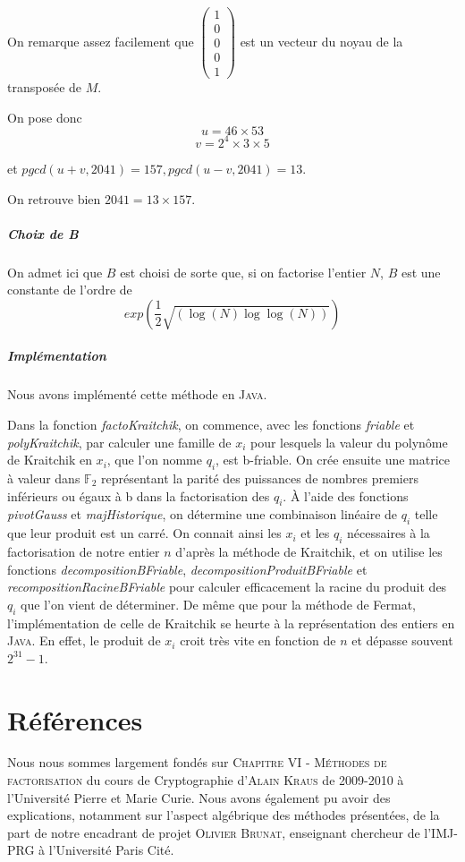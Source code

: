 \documentclass[11pt,a4paper]{article}
\begin{document}
 	On remarque assez facilement que 
 	$\begin{pmatrix}
 		1\\
 		0\\
 		0\\
 		0\\
 		1
 	\end{pmatrix}$ est un vecteur du noyau de la transposée de $M$.
 
 	On pose donc 
 	$$ u = 46 \times 53 $$ 
 	$$ v = 2^4 \times 3 \times 5$$
 	
 	et $pgcd(u+v, 2041) = 157, pgcd(u-v, 2041) = 13$.
 	
 	On retrouve bien $2041 = 13 \times 157$.
 	
 	
 	\subparagraph{Choix de B}
	
	On admet ici que $B$ est choisi de sorte que, si on factorise l'entier $N$, $B$ est une constante de l'ordre de 
	$$exp(\frac{1}{2} \sqrt{(\log(N) \log\log(N))})$$
		
	\subparagraph{Implémentation}
	Nous avons implémenté cette méthode en \textsc{Java}.

	Dans la fonction \textit{factoKraitchik}, on commence, avec les fonctions \textit{friable} et \textit{polyKraitchik}, par calculer une famille de $x_i$ pour lesquels la valeur du polynôme de Kraitchik en $x_i$, que l'on nomme $q_i$, est b-friable. On crée ensuite une matrice à valeur dans $\mathbb{F}_2$ représentant la parité des puissances de nombres premiers inférieurs ou égaux à b dans la factorisation des $q_i$. À l'aide des fonctions \textit{pivotGauss} et \textit{majHistorique}, on détermine une combinaison linéaire de $q_i$ telle que leur produit est un carré. On connait ainsi les $x_i$ et les $q_i$ nécessaires à la factorisation de notre entier $n$ d'après la méthode de Kraitchik, et on utilise les fonctions \textit{decompositionBFriable}, \textit{decompositionProduitBFriable} et \textit{recompositionRacineBFriable} pour calculer efficacement la racine du produit des $q_i$ que l'on vient de déterminer. De même que pour la méthode de Fermat, l'implémentation de celle de Kraitchik se heurte à la représentation des entiers en \textsc{Java}. En effet, le produit de $x_i$ croit très vite en fonction de $n$ et dépasse souvent $2^{31} - 1$.
	
	
	\newpage
	\section{\LARGE{Références}}
	Nous nous sommes largement fondés sur \textsc{Chapitre VI - Méthodes de factorisation} du cours de Cryptographie d'\textsc{Alain Kraus} de 2009-2010 à l'Université Pierre et Marie Curie. Nous avons également pu avoir des explications, notamment sur l'aspect algébrique des méthodes présentées, de la part de notre encadrant de projet \textsc{Olivier Brunat}, enseignant chercheur de l'IMJ-PRG à l'Université Paris Cité.
	
\end{document}
